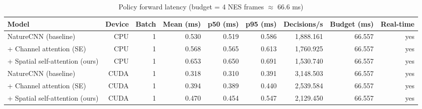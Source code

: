 \begin{table}[t]
\centering
\caption{Policy forward latency (budget = 4 NES frames $\approx$ 66.6 ms)}
\label{tab:inference_latency}
\begin{tabular}{lrrrrrrrr}
\toprule
Model & Device & Batch & Mean (ms) & p50 (ms) & p95 (ms) & Decisions/s & Budget (ms) & Real-time \\
\midrule
NatureCNN (baseline) & CPU & 1 & 0.530 & 0.519 & 0.586 & 1,888.161 & 66.557 & yes \\
+ Channel attention (SE) & CPU & 1 & 0.568 & 0.565 & 0.613 & 1,760.925 & 66.557 & yes \\
+ Spatial self-attention (ours) & CPU & 1 & 0.653 & 0.650 & 0.691 & 1,530.740 & 66.557 & yes \\
NatureCNN (baseline) & CUDA & 1 & 0.318 & 0.310 & 0.391 & 3,148.503 & 66.557 & yes \\
+ Channel attention (SE) & CUDA & 1 & 0.394 & 0.389 & 0.440 & 2,539.584 & 66.557 & yes \\
+ Spatial self-attention (ours) & CUDA & 1 & 0.470 & 0.454 & 0.547 & 2,129.450 & 66.557 & yes \\
\bottomrule
\end{tabular}
\end{table}
